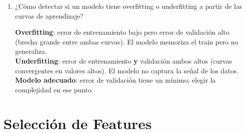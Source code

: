 \documentclass[11pt,a4paper]{article}
\begin{document}
\begin{enumerate}[label=\textbf{P\arabic*.}, resume]
\begin{answerbox}
\[
  \mathbb{E}\!\left[(y - \hat{f}(x))^2\right]
  = \underbrace{\left(\mathbb{E}[\hat{f}(x)] - f(x)\right)^2}_{\text{Sesgo}^2}
  + \underbrace{\mathbb{E}\!\left[\left(\hat{f}(x) - \mathbb{E}[\hat{f}(x)]\right)^2\right]}_{\text{Varianza}}
  + \underbrace{\sigma^2_\varepsilon}_{\text{Ruido irred.}}
\]
\textbf{Ejemplo}: Un \'arbol muy profundo tiene bajo sesgo (se ajusta bien al train) pero
alta varianza (cambia mucho ante nuevos datos $\Rightarrow$ overfitting). Un modelo lineal
simple tiene alto sesgo (no captura patrones complejos $\Rightarrow$ underfitting) pero
baja varianza.
\end{answerbox}

\item ¿C\'omo detectar si un modelo tiene overfitting o underfitting a partir de las
  curvas de aprendizaje?

\begin{answerbox}
\textbf{Overfitting}: error de entrenamiento bajo pero error de validaci\'on alto (brecha
grande entre ambas curvas). El modelo memoriza el train pero no generaliza.\\[4pt]
\textbf{Underfitting}: error de entrenamiento \textbf{y} validaci\'on ambos altos (curvas
convergentes en valores altos). El modelo no captura la se\~nal de los datos.\\[4pt]
\textbf{Modelo adecuado}: error de validaci\'on tiene un m\'inimo; elegir la complejidad
en ese punto.
\end{answerbox}

\end{enumerate}

\section{Selecci\'on de Features}
\end{document}
